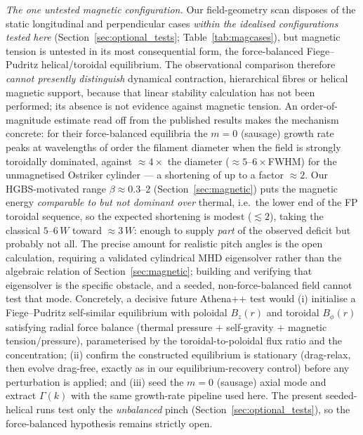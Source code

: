 \documentclass[usenatbib,twoside,twocolumn]{mnras}
\begin{document}
\emph{The one untested magnetic configuration.} Our field-geometry scan disposes of the static longitudinal and perpendicular cases \emph{within the idealised configurations tested here} (Section~\ref{sec:optional_tests}; Table~\ref{tab:magcases}), but magnetic tension is untested in its most consequential form, the force-balanced Fiege--Pudritz helical/toroidal equilibrium. The observational comparison therefore \emph{cannot presently distinguish} dynamical contraction, hierarchical fibres or helical magnetic support, because that linear stability calculation has not been performed; its absence is not evidence against magnetic tension. An order-of-magnitude estimate read off from the published \citet{Fiege2000} results makes the mechanism concrete: for their force-balanced equilibria the $m=0$ (sausage) growth rate peaks at wavelengths of order the filament diameter when the field is strongly toroidally dominated, against $\approx4\times$ the diameter ($\approx5$--$6\times$FWHM) for the unmagnetised Ostriker cylinder --- a shortening of up to a factor $\approx2$. Our HGBS-motivated range $\beta\approx0.3$--$2$ (Section~\ref{sec:magnetic}) puts the magnetic energy \emph{comparable to but not dominant over} thermal, i.e.\ the lower end of the FP toroidal sequence, so the expected shortening is modest ($\lesssim2$), taking the classical $5$--$6\,W$ toward $\approx3\,W$: enough to supply \emph{part} of the observed deficit but probably not all. The precise amount for realistic pitch angles is the open calculation, requiring a validated cylindrical MHD eigensolver rather than the algebraic relation of Section~\ref{sec:magnetic}; building and verifying that eigensolver is the specific obstacle, and a seeded, non-force-balanced field cannot test that mode. Concretely, a decisive future Athena++ test would (i) initialise a Fiege--Pudritz self-similar equilibrium with poloidal $B_z(r)$ and toroidal $B_\phi(r)$ satisfying radial force balance (thermal pressure $+$ self-gravity $+$ magnetic tension/pressure), parameterised by the toroidal-to-poloidal flux ratio and the concentration; (ii) confirm the constructed equilibrium is stationary (drag-relax, then evolve drag-free, exactly as in our equilibrium-recovery control) before any perturbation is applied; and (iii) seed the $m=0$ (sausage) axial mode and extract $\Gamma(k)$ with the same growth-rate pipeline used here. The present seeded-helical runs test only the \emph{unbalanced} pinch (Section~\ref{sec:optional_tests}), so the force-balanced hypothesis remains strictly open.
\end{document}
